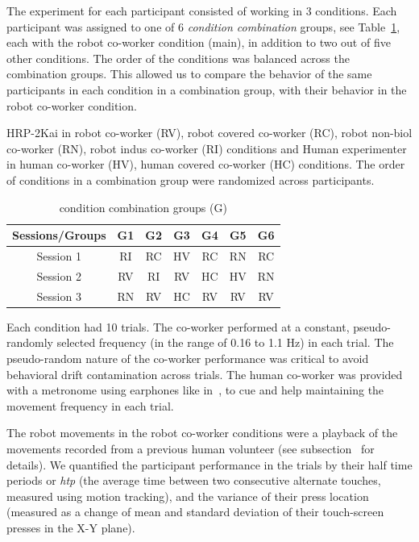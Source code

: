 The experiment for each participant consisted of working in 3 conditions. Each participant was assigned to one of 6 \emph{condition combination} groups, see Table~\ref{groupTable}, each with the robot co-worker condition (main), in addition to two out of five other conditions. The order of the conditions was balanced across the combination groups. This allowed us to compare the behavior of the same participants in each condition in a combination group, with their behavior in the robot co-worker condition.


\begin{table}[hpt]
	\caption{condition combination groups (G)}
	{HRP-2Kai in robot co-worker (RV), robot covered co-worker (RC), robot non-biol co-worker (RN), robot indus co-worker (RI) conditions and Human experimenter in human co-worker (HV), human covered co-worker (HC) conditions. The order of conditions in a combination group were randomized across participants.}
	\label{groupTable}
	\begin{center}
		\begin{tabular}{|c cccccc|}
			\hline  
			{\bf Sessions/Groups} &  {\bf G1} &  {\bf G2} &  {\bf G3} &  {\bf G4} &  {\bf G5} &  {\bf G6}  \\ 
			\hline
			Session 1 & RI & RC & HV & RC & RN &  RC \\ 
			
			Session 2 & RV & RI & RV & HC & HV &  RN \\ 
			
			Session 3 & RN & RV & HC & RV & RV &  RV \\ 
			\hline 			
		\end{tabular} 
	\end{center}
\end{table}


Each condition had 10 trials. The co-worker performed at a constant, pseudo-randomly selected frequency (in the range of 0.16 to 1.1 Hz) in each trial. The pseudo-random nature of the co-worker performance was critical to avoid behavioral drift contamination across trials. The human co-worker was provided with a metronome using earphones like in~\cite{Bisio:PlosOne:2014}, to cue and help maintaining the movement frequency in each trial.

The robot movements in the robot co-worker conditions were a playback of the movements recorded from a previous human volunteer (see subsection~ for details). We quantified the participant performance in the trials by their half time periods or {\it htp} (the average time between two consecutive alternate touches, measured using motion tracking), and the variance of their press location (measured as a change of mean and standard deviation of their touch-screen presses in the X-Y plane).

